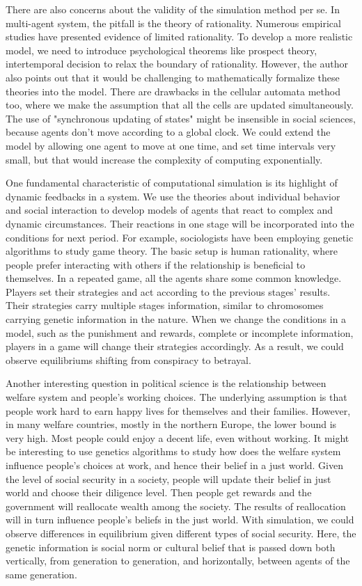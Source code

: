 \documentclass[letterpaper,12pt]{article}
\theoremstyle{definition}
\begin{document}
There are also concerns about the validity of the simulation method per se. In multi-agent system, the pitfall is the theory of rationality. Numerous empirical studies have presented evidence of limited rationality. To develop a more realistic model, we need to introduce psychological theorems like prospect theory, intertemporal decision to relax the boundary of rationality. However, the author also points out that it would be challenging to mathematically formalize these theories into the model. There are drawbacks in the cellular automata method too, where we make the assumption that all the cells are updated simultaneously. The use of "synchronous updating of states" might be insensible in social sciences, because agents don't move according to a global clock. We could extend the model by allowing one agent to move at one time, and set time intervals very small, but that would increase the complexity of computing exponentially.

One fundamental characteristic of computational simulation is its highlight of dynamic feedbacks in a system. We use the theories about individual behavior and social interaction to develop models of agents that react to complex and dynamic circumstances. Their reactions in one stage will be incorporated into the conditions for next period. For example, sociologists have been employing genetic algorithms to study game theory. The basic setup is human rationality, where people prefer interacting with others if the relationship is beneficial to themselves. In a repeated game, all the agents share some common knowledge. Players set their strategies and act according to the previous stages' results. Their strategies carry multiple stages information, similar to chromosomes carrying genetic information in the nature. When we change the conditions in a model, such as the punishment and rewards, complete or incomplete information, players in a game will change their strategies accordingly. As a result, we could observe equilibriums shifting from conspiracy to betrayal. 

Another interesting question in political science is the relationship between welfare system and people's working choices. The underlying assumption is that people work hard to earn happy lives for themselves and their families. However, in many welfare countries, mostly in the northern Europe, the lower bound is very high. Most people could enjoy a decent life, even without working. It might be interesting to use genetics algorithms to study how does the welfare system influence people's choices at work, and hence their belief in a just world. Given the level of social security in a society, people will update their belief in just world and choose their diligence level. Then people get rewards and the government will reallocate wealth among the society. The results of reallocation will in turn influence people's beliefs in the just world. With simulation, we could observe differences in equilibrium given different types of social security. Here, the genetic information is social norm or cultural belief that is passed down both vertically, from generation to generation, and horizontally, between agents of the same generation.
\end{document}
